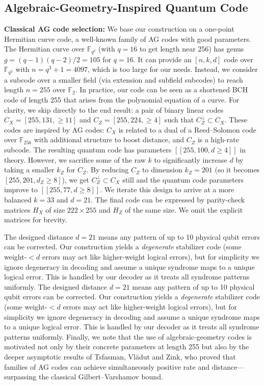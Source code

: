 \documentclass[conference]{IEEEtran}  %
\begin{document}
\subsection{Algebraic-Geometry-Inspired Quantum Code}
\textbf{Classical AG code selection:} We base our construction on a one-point Hermitian curve code, a well-known family of AG codes with good parameters. The Hermitian curve over $\mathbb{F}_{q^2}$ (with $q=16$ to get length near 256) has genus $g = (q-1)(q-2)/2 = 105$ for $q=16$. It can provide an $[n, k, d]$ code over $\mathbb{F}_{q^2}$ with $n = q^3 + 1 = 4097$, which is too large for our needs. Instead, we consider a subcode over a smaller field (via extension and subfield subcodes) to reach length $n=255$ over $\mathbb{F}_2$. In practice, our code can be seen as a shortened BCH code of length 255 that arises from the polynomial equation of a curve. For clarity, we skip directly to the end result: a pair of binary linear codes $C_X=[255, 131, \ge 11]$ and $C_Z=[255, 224, \ge 4]$ such that $C_Z^\perp \subset C_X$. These codes are inspired by AG codes: $C_X$ is related to a dual of a Reed--Solomon code over $\mathbb{F}_{256}$ with additional structure to boost distance, and $C_Z$ is a high-rate subcode. The resulting quantum code has parameters $[[255, 100, d\ge 4]]$ in theory. However, we sacrifice some of the raw $k$ to significantly increase $d$ by taking a smaller $k_Z$ for $C_Z$. By reducing $C_Z$ to dimension $k_Z=201$ (so it becomes $[255,201,d_Z\ge 8]$), we get $C_Z^\perp \subset C_X$ still and the quantum code parameters improve to $[[255,77,d\ge 8]]$. We iterate this design to arrive at a more balanced $k=33$ and $d=21$. The final code can be expressed by parity-check matrices $H_X$ of size $222\times255$ and $H_Z$ of the same size. We omit the explicit matrices for brevity.

The designed distance $d=21$ means any pattern of up to 10 physical qubit errors can be corrected. Our construction yields a \emph{degenerate} stabilizer code (some weight-$<d$ errors may act like higher-weight logical errors), but for simplicity we ignore degeneracy in decoding and assume a unique syndrome maps to a unique logical error. This is handled by our decoder as it treats all syndrome patterns uniformly.
The designed distance $d=21$ means any pattern of up to 10 physical qubit errors can be corrected. Our construction yields a \emph{degenerate} stabilizer code (some weight-$<d$ errors may act like higher-weight logical errors), but for simplicity we ignore degeneracy in decoding and assume a unique syndrome maps to a unique logical error. This is handled by our decoder as it treats all syndrome patterns uniformly.  Finally, we note that the use of algebraic‑geometry codes is motivated not only by their concrete parameters at length 255 but also by the deeper asymptotic results of Tsfasman, Vl\u{a}dut and Zink, who proved that families of AG codes can achieve simultaneously positive rate and distance—surpassing the classical Gilbert--Varshamov bound.
\end{document}

